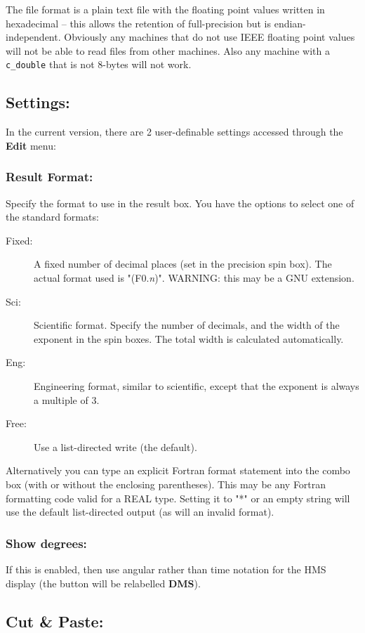 \documentclass{article}
\begin{document}
  The file format is a plain text file with the floating point values
  written in hexadecimal -- this allows the retention of full-precision
  but is endian-independent. Obviously any machines that do not use
  IEEE floating point values will not be able to read files from other
  machines. Also any machine with a \texttt{c\_double} that is not
  8-bytes will not work.

  \subsection{Settings:}

  In the current version, there are 2 user-definable settings accessed
  through the \textbf{Edit} menu:

  \subsubsection{Result Format:}
  Specify the format to use in the result box. You have the options to
  select one of the standard formats:
  \begin{description}
  \item [Fixed:] A fixed number of decimal places (set in the precision
    spin box). The actual format used is "(F0.\emph{n})". WARNING: this
    may be a GNU extension.
  \item[Sci:] Scientific format. Specify the number of decimals, and
    the width of the exponent in the spin boxes. The total width is
    calculated automatically.
  \item[Eng:] Engineering format, similar to scientific, except that
    the exponent is always a multiple of 3.
  \item[Free:] Use a list-directed write (the default).
  \end{description}
  Alternatively you can type an explicit Fortran format statement into
  the combo box (with or without the enclosing parentheses). This may
  be any Fortran formatting code valid for a REAL type. Setting it to
  "*" or an empty string will use the default list-directed output (as
  will an invalid format).

  \subsubsection{Show degrees:}
  If this is enabled, then use angular rather than time notation for the
  HMS display (the button will be relabelled \textbf{DMS}).

\subsection{Cut \& Paste:}
\end{document}
